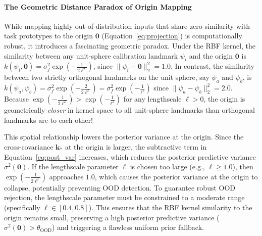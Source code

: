 \paragraph{The Geometric Distance Paradox of Origin Mapping}
While mapping highly out-of-distribution inputs that share zero similarity with task prototypes to the origin $\mathbf{0}$ (Equation~\ref{eq:projection}) is computationally robust, it introduces a fascinating geometric paradox. Under the RBF kernel, the similarity between any unit-sphere calibration landmark $\psi_i$ and the origin $\mathbf{0}$ is $k(\psi_i, \mathbf{0}) = \sigma_f^2 \exp\left(-\frac{1}{2 \ell^2}\right)$, since $\|\psi_i - \mathbf{0}\|_2^2 = 1.0$. In contrast, the similarity between two strictly orthogonal landmarks on the unit sphere, say $\psi_a$ and $\psi_b$, is $k(\psi_a, \psi_b) = \sigma_f^2 \exp\left(-\frac{2}{2 \ell^2}\right) = \sigma_f^2 \exp\left(-\frac{1}{\ell^2}\right)$ since $\|\psi_a - \psi_b\|_2^2 = 2.0$. Because $\exp\left(-\frac{1}{2 \ell^2}\right) > \exp\left(-\frac{1}{\ell^2}\right)$ for any lengthscale $\ell > 0$, the origin is geometrically \emph{closer} in kernel space to all unit-sphere landmarks than orthogonal landmarks are to each other! 

This spatial relationship lowers the posterior variance at the origin. Since the cross-covariance $\mathbf{k}_*$ at the origin is larger, the subtractive term in Equation~\ref{eq:post_var} increases, which reduces the posterior predictive variance $\sigma^2(\mathbf{0})$. If the lengthscale parameter $\ell$ is chosen too large (e.g., $\ell \ge 1.0$), then $\exp\left(-\frac{1}{2 \ell^2}\right)$ approaches $1.0$, which causes the posterior variance at the origin to collapse, potentially preventing OOD detection. To guarantee robust OOD rejection, the lengthscale parameter must be constrained to a moderate range (specifically $\ell \in [0.4, 0.8]$). This ensures that the RBF kernel similarity to the origin remains small, preserving a high posterior predictive variance ($\sigma^2(\mathbf{0}) > \theta_{\text{OOD}}$) and triggering a flawless uniform prior fallback.

